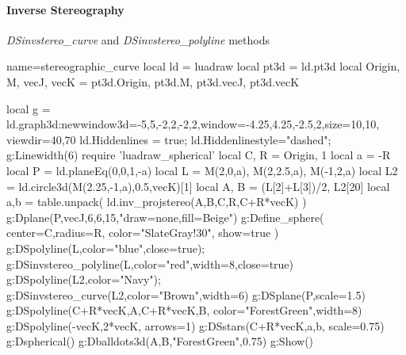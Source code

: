 \paragraph{Inverse Stereography}

\begin{demo}{\emph{DSinvstereo\_curve} and \emph{DSinvstereo\_polyline} methods}
\begin{luadraw}{name=stereographic_curve}
local ld = luadraw
local pt3d = ld.pt3d
local Origin, M, vecJ, vecK = pt3d.Origin, pt3d.M, pt3d.vecJ, pt3d.vecK

local g = ld.graph3d:new{window3d={-5,5,-2,2,-2,2},window={-4.25,4.25,-2.5,2},size={10,10}, viewdir={40,70}}
ld.Hiddenlines = true; ld.Hiddenlinestyle="dashed"; g:Linewidth(6)
require 'luadraw_spherical'
local C, R = Origin, 1
local a = -R
local P = ld.planeEq(0,0,1,-a)
local L = {M(2,0,a), M(2,2.5,a), M(-1,2,a)}
local L2 = ld.circle3d(M(2.25,-1,a),0.5,vecK)[1]
local A, B = (L[2]+L[3])/2, L2[20]
local a,b = table.unpack( ld.inv_projstereo({A,B},{C,R},C+R*vecK) )
g:Dplane(P,vecJ,6,6,15,"draw=none,fill=Beige")
g:Define_sphere( {center=C,radius=R, color="SlateGray!30", show=true} )
g:DSpolyline(L,{color="blue",close=true}); g:DSinvstereo_polyline(L,{color="red",width=8,close=true})
g:DSpolyline(L2,{color="Navy"}); g:DSinvstereo_curve(L2,{color="Brown",width=6})
g:DSplane(P,{scale=1.5})
g:DSpolyline({{C+R*vecK,A},{C+R*vecK,B}}, {color="ForestGreen",width=8})
g:DSpolyline({{-vecK,2*vecK}}, {arrows=1})
g:DSstars({C+R*vecK,a,b}, {scale=0.75})
g:Dspherical()
g:Dballdots3d({A,B},"ForestGreen",0.75)
g:Show()
\end{luadraw}
\end{demo}
